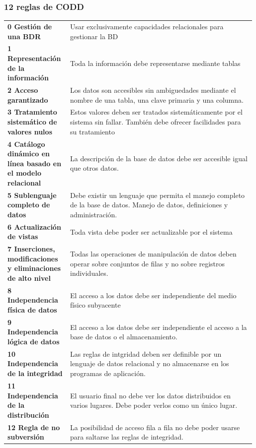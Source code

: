     \subsubsection{12 reglas de CODD}
        \begin{table}[H]
        \begin{tabular}{>{\bf}p{0.25\linewidth}p{0.74\linewidth}}
            0 Gestión de una BDR & Usar exclusivamente capacidades relacionales para gestionar la BD \\
            1 Representación de la información & Toda la información debe representarse mediante tablas \\
            2 Acceso garantizado & Los datos son accesibles sin ambiguedades mediante el nombre de una tabla, una clave primaria y una columna. \\
            3 Tratamiento sistemático de valores nulos & Estos valores deben ser tratados sistemáticamente por el sistema sin fallar. También debe ofrecer facilidades para su tratamiento \\
            4 Catálogo dinámico en línea basado en el modelo relacional & La descripción de la base de datos debe ser accesible igual que otros datos.\\
            5 Sublenguaje completo de datos & Debe existir un lenguaje que permita el manejo completo de la base de datos. Manejo de datos, definiciones y administración. \\
            6 Actualización de vistas & Toda vista debe poder ser actualizable por el sistema \\
            7 Inserciones, modificaciones y eliminaciones de alto nivel & Todas las operaciones de manipulación de datos deben operar sobre conjuntos de filas y no sobre registros individuales. \\
            8 Independencia física de datos & El acceso a los datos debe ser independiente del medio físico subyacente \\
            9 Independencia lógica de datos & El acceso a los datos debe ser independiente el acceso a la base de datos o el almacenamiento. \\
            10 Independencia de la integridad & Las reglas de intgridad deben ser definible por un lenguaje de datos relacional y no almacenarse en los programas de aplicación. \\
            11 Independencia de la distribución & El usuario final no debe ver los datos distribuidos en varios lugares. Debe poder verlos como un único lugar. \\
            12 Regla de no subversión & La posibilidad de acceso fila a fila no debe poder usarse para saltarse las reglas de integridad. \\
        \end{tabular}
        \end{table}

